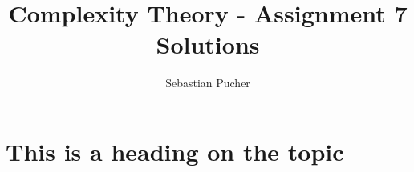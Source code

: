 \documentclass[12pt]{article}
\title{Complexity Theory - Assignment 7 Solutions}
\author{Sebastian Pucher}
\begin{document}
\maketitle                             


\normalsize

\tableofcontents

\newpage

\section{This is a heading on the topic}
\end{document}
